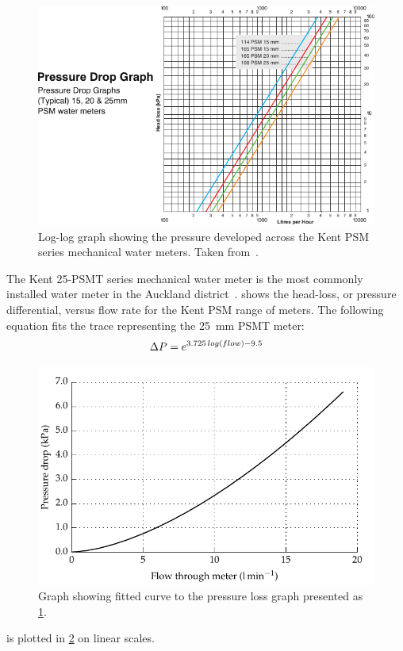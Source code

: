     \begin{figure}
        \centering
        \includegraphics[width=\linewidth]{content/pt1/02-WirelessWaterMeter/graphics/Kent-PSM-HeadLoss}
        \caption{
            \label{fig:headloss}
            Log-log graph showing the pressure developed across the Kent PSM series mechanical water meters. Taken from~\cite{Elster2008}.
        }
    \end{figure}
    The Kent 25-PSMT series mechanical water meter is the most commonly installed water meter in the Auckland district~\cite{WatercareNewZealand2014}.
     shows the head-loss, or pressure differential, versus flow rate for the Kent PSM range of meters.
    The following equation fits the trace representing the \SI{25}{\milli\meter} PSMT meter:
    \begin{equation}
        \Delta P = e^{3.725\thinspace log(flow) - 9.5}
        \label{eqn:Flow_to_pressure_25mmPSMT}
    \end{equation}
    \begin{figure}
        \centering
        \includegraphics[width=\linewidth]{content/pt1/02-WirelessWaterMeter/graphics/graph_pressureLoss}
        \caption{Graph showing fitted curve to the pressure loss graph presented as \cref{fig:headloss}.}
        \label{fig:headloss_fit}
    \end{figure}
     is plotted in \cref{fig:headloss_fit} on linear scales.

